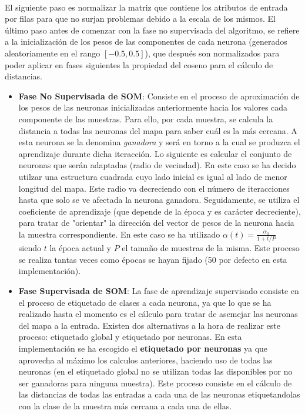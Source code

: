 \documentclass[10pt, a4paper,spanish]{article}
\begin{document}
			\paragraph{}
			El siguiente paso es normalizar la matriz que contiene los atributos de entrada por filas para que no surjan problemas debido a la escala de los mismos. El último paso antes de comenzar con la fase no supervisada del algoritmo, se refiere a la inicialización de los pesos de las componentes de cada neurona (generados aleatoriamente en el rango $[-0.5, 0.5]$), que después son normalizados para poder aplicar en fases siguientes la propiedad del coseno para el cálculo de distancias.

			\begin{itemize}

				\item \textbf{Fase No Supervisada de SOM}: Consiste en el proceso de aproximación de los pesos de las neuronas inicializadas anteriormente hacia los valores cada componente de las muestras. Para ello, por cada muestra, se calcula la distancia a todas las neuronas del mapa para saber cuál es la más cercana. A esta neurona se la denomina \emph{ganadora} y será en torno a la cual se produzca el aprendizaje durante dicha iteracción. Lo siguiente es calcular el conjunto de neuronas que serán adaptadas (radio de vecindad). En este caso se ha decido utilzar una estructura cuadrada cuyo lado inicial es igual al lado de menor longitud del mapa. Este radio va decreciendo con el número de iteracciones hasta que solo se ve afectada la neurona ganadora. Seguidamente, se utiliza el coeficiente de aprendizaje (que depende de la época y es carácter decreciente), para tratar de "orientar" la dirección del vector de pesos de la neurona hacia la muestra correspondiente. En este caso se ha utilizado $\alpha(t) =  \frac{\alpha_0}{1 + t/P}$ siendo $t$ la época actual y $P$ el tamaño de muestras de la misma. Este proceso se realiza tantas veces como épocas se hayan fijado (50 por defecto en esta implementación).


				\item \textbf{Fase Supervisada de SOM}: La fase de aprendizaje supervisado consiste en el proceso de etiquetado de clases a cada neurona, ya que lo que se ha realizado hasta el momento es el cálculo para tratar de asemejar las neuronas del mapa a la entrada. Existen dos alternativas a la hora de realizar este proceso: etiquetado global y etiquetado por neuronas. En esta implementación se ha escogido el \textbf{etiquetado por neuronas} ya que aprovecha al máximo los calculos anteriores, haciendo uso de todas las neuronas (en el etiquetado global no se utilizan todas las disponibles por no ser ganadoras para ninguna muestra). Este proceso consiste en el cálculo de las distancias de todas las entradas a cada una de las neuronas etiquetandolas con la clase de la muestra más cercana a cada una de ellas.

			\end{itemize}
\end{document}
